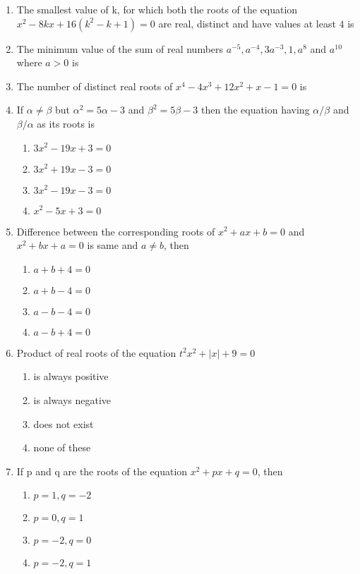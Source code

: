 \begin{enumerate}[label=\arabic*.,ref=\thesubsection.\theenumi]
\item The smallest value of k, for which both the roots of the equation $x^2-8kx+16(k^2-k+1)=0$ are real, distinct and have values at least $4$ is

\item The minimum value of the sum of real numbers $a^{-5}, a^{-4}, 3a^{-3}, 1, a^8$ and $a^{10}$ where $a>0$ is

\item The number of distinct real roots of $x^4-4x^3+12x^2+x-1=0$ is

\item If $\alpha\neq\beta$ but $\alpha^2=5\alpha-3$ and $\beta^2=5\beta-3$ then the equation having $\alpha/\beta$ and $\beta/\alpha$ as its roots is 
\begin{enumerate}
\item $3x^2-19x+3=0$
\item $3x^2+19x-3=0$ 
\item $3x^2-19x-3=0$
\item $x^2-5x+3=0$ 
\end{enumerate}

\item Difference between the corresponding roots of $x^2+ax+b=0$ and $x^2+bx+a=0$ is same and $a\neq{b}$, then
\begin{enumerate}
\item $a+b+4=0$
\item $a+b-4=0$ 
\item $a-b-4=0$
\item $a-b+4=0$
\end{enumerate}

\item Product of real roots of the equation $t^2x^2+|x|+9=0$
\begin{enumerate}
\item is always positive
\item is always negative 
\item does not exist
\item none of these 
\end{enumerate}

\item If p and q are the roots of the equation $x^2+px+q=0$, then
\begin{enumerate}
\item $p=1, q=-2$
\item $p=0, q=1$ 
\item $p=-2, q=0$
\item $p=-2, q=1$ 
\end{enumerate}


\end{enumerate}

